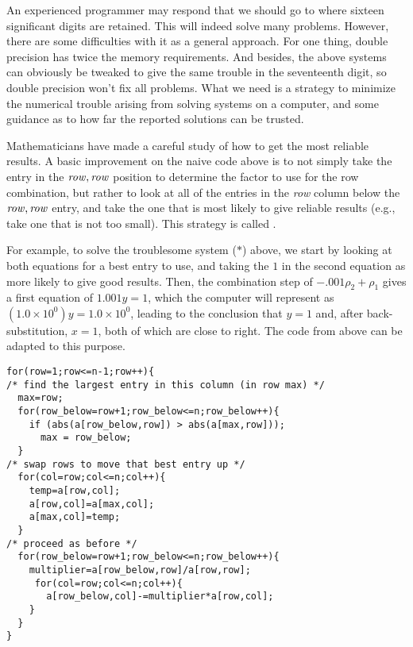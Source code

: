An experienced programmer may respond that we should go to
where sixteen significant digits are retained.
This will indeed solve many problems.
However, there are some difficulties with it as a general approach.
For one thing, double precision has twice
the memory requirements.
And besides, the above systems can obviously be tweaked to give the
same trouble in the seventeenth digit, so double precision
won't fix all problems.
What we need is a strategy to minimize the numerical
trouble arising from solving systems on a computer,
and some guidance as to how far the reported 
solutions can be trusted. 

Mathematicians have made a careful study of how to get the most
reliable results. 
A basic improvement on the naive code above 
is to not simply take the entry
in the $\text{\textit{row}},\text{\textit{row}}$
position to determine the factor to use for the row combination,
but rather to look at all of the entries in the \textit{row}
column below the $\text{\textit{row}},\text{\textit{row}}$ entry, 
and take the one that is most likely to give reliable results
(e.g., take one that is not too small).
This strategy is called .%

For example, to solve the troublesome system ($*$) above,
we start by looking at both equations for a best entry to use, 
and taking the $1$ in
the second equation as more likely to give good results.
Then, the combination step of $-.001\rho_2+\rho_1$ gives a first equation of 
$1.001y=1$, which the computer will represent as 
$(1.0\times 10^{0})y=1.0\times 10^{0}$, leading to the conclusion that 
$y=1$ and, after back-substitution, $x=1$, 
both of which are close to right.  
The code from above can be adapted to this purpose.
\begin{lstlisting}
for(row=1;row<=n-1;row++){
/* find the largest entry in this column (in row max) */
  max=row;
  for(row_below=row+1;row_below<=n;row_below++){
    if (abs(a[row_below,row]) > abs(a[max,row]));
      max = row_below;
  }
/* swap rows to move that best entry up */
  for(col=row;col<=n;col++){
    temp=a[row,col];
    a[row,col]=a[max,col];
    a[max,col]=temp;
  }
/* proceed as before */
  for(row_below=row+1;row_below<=n;row_below++){
    multiplier=a[row_below,row]/a[row,row];
     for(col=row;col<=n;col++){
       a[row_below,col]-=multiplier*a[row,col];
    }
  }
}
\end{lstlisting}

